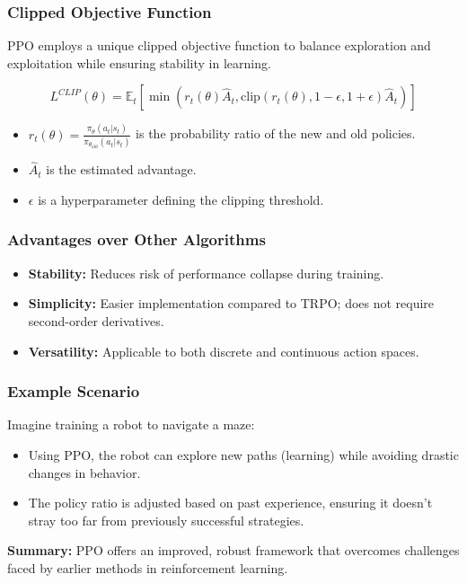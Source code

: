 \documentclass{beamer}
\begin{document}
\begin{frame}[fragile]
    \frametitle{Clipped Objective Function}

    PPO employs a unique clipped objective function to balance exploration and exploitation while ensuring stability in learning.

    \begin{equation}
        L^{CLIP}(\theta) = \mathbb{E}_t \left[ \min\left( r_t(\theta) \hat{A}_t, \text{clip}\left(r_t(\theta), 1 - \epsilon, 1 + \epsilon\right) \hat{A}_t \right) \right]
    \end{equation}

    \begin{itemize}
        \item \( r_t(\theta) = \frac{\pi_\theta(a_t | s_t)}{\pi_{\theta_{\text{old}}}(a_t | s_t)} \) is the probability ratio of the new and old policies.
        \item \( \hat{A}_t \) is the estimated advantage.
        \item \( \epsilon \) is a hyperparameter defining the clipping threshold.
    \end{itemize}
\end{frame}

\begin{frame}[fragile]
    \frametitle{Advantages over Other Algorithms}

    \begin{itemize}
        \item \textbf{Stability:} Reduces risk of performance collapse during training.
        \item \textbf{Simplicity:} Easier implementation compared to TRPO; does not require second-order derivatives.
        \item \textbf{Versatility:} Applicable to both discrete and continuous action spaces.
    \end{itemize}
\end{frame}

\begin{frame}[fragile]
    \frametitle{Example Scenario}

    Imagine training a robot to navigate a maze:
    \begin{itemize}
        \item Using PPO, the robot can explore new paths (learning) while avoiding drastic changes in behavior.
        \item The policy ratio is adjusted based on past experience, ensuring it doesn’t stray too far from previously successful strategies.
    \end{itemize}

    \textbf{Summary:} PPO offers an improved, robust framework that overcomes challenges faced by earlier methods in reinforcement learning.
\end{frame}
\end{document}
